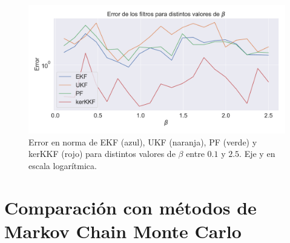 \begin{figure}[h!]
    \centering
    \includegraphics[width=0.9\linewidth]{img/content/chapter4/nonlinear_filters_sir_error_beta.pdf}
    \caption{Error en norma de EKF (azul), UKF (naranja), PF (verde) y kerKKF (rojo) para distintos valores de $\beta$ entre $0.1$ y $2.5$. Eje y en escala logarítmica.}
    \label{fig:nonlinear_filters_sir_error_beta}
\end{figure}

\newpage

\section{Comparación con métodos de Markov Chain Monte Carlo}


